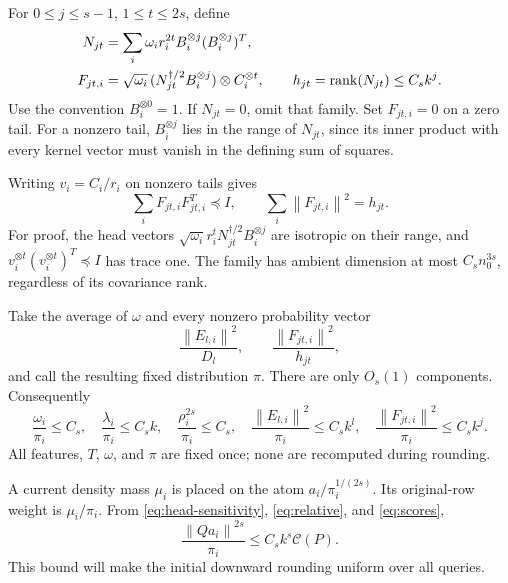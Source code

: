 \documentclass[11pt]{article}
\theoremstyle{remark}\newtheorem{remark}[theorem]{Remark}
\newcommand{\norm}[1]{\left\|#1\right\|}\newcommand{\ip}[2]{\left\langle #1,#2\right\rangle}
\newcommand{\cost}{\mathcal C}\newcommand{\OPT}{\mathsf{OPT}}
\begin{document}
For $0\le j\le s-1$, $1\le t\le2s$, define
\begin{equation}\label{eq:F}
 \begin{split}
 N_{jt}&=\sum_i\omega_i r_i^{2t}B_i^{\otimes j}(B_i^{\otimes j})^T,\\
 F_{jt,i}&=\sqrt{\omega_i}\,(N_{jt}^{\dagger/2}B_i^{\otimes j})\otimes C_i^{\otimes t},
 \qquad h_{jt}=\operatorname{rank}(N_{jt})\le C_s k^j.
 \end{split}
\end{equation}
Use the convention $B_i^{\otimes0}=1$. If $N_{jt}=0$, omit that family. Set $F_{jt,i}=0$ on a zero tail. For a nonzero tail, $B_i^{\otimes j}$ lies in the range of $N_{jt}$, since its inner product with every kernel vector must vanish in the defining sum of squares.

Writing $v_i=C_i/r_i$ on nonzero tails gives
\begin{equation}\label{eq:Fcov}
 \sum_iF_{jt,i}F_{jt,i}^T\preceq I,\qquad
 \sum_i\norm{F_{jt,i}}^2=h_{jt}.
\end{equation}
For proof, the head vectors $\sqrt{\omega_i}r_i^tN_{jt}^{\dagger/2}B_i^{\otimes j}$ are isotropic on their range, and $v_i^{\otimes t}(v_i^{\otimes t})^T\preceq I$ has trace one. The family has ambient dimension at most $C_s n_0^{3s}$, regardless of its covariance rank.

Take the average of $\omega$ and every nonzero probability vector
\begin{equation}\label{eq:pi}
 \frac{\norm{E_{l,i}}^2}{D_l},\qquad
 \frac{\norm{F_{jt,i}}^2}{h_{jt}},
\end{equation}
and call the resulting fixed distribution $\pi$. There are only $O_s(1)$ components. Consequently
\begin{equation}\label{eq:scores}
 \frac{\omega_i}{\pi_i}\le C_s,\quad
 \frac{\lambda_i}{\pi_i}\le C_s k,\quad
 \frac{\rho_i^{2s}}{\pi_i}\le C_s,\quad
 \frac{\norm{E_{l,i}}^2}{\pi_i}\le C_s k^l,\quad
 \frac{\norm{F_{jt,i}}^2}{\pi_i}\le C_s k^j.
\end{equation}
All features, $T$, $\omega$, and $\pi$ are fixed once; none are recomputed during rounding.

A current density mass $\mu_i$ is placed on the atom $a_i/\pi_i^{1/(2s)}$. Its original-row weight is $\mu_i/\pi_i$. From \eqref{eq:head-sensitivity}, \eqref{eq:relative}, and \eqref{eq:scores},
\begin{equation}\label{eq:round-sensitivity}
 \frac{\norm{Qa_i}^{2s}}{\pi_i}\le C_s k^s\cost(P).
\end{equation}
This bound will make the initial downward rounding uniform over all queries.
\end{document}

